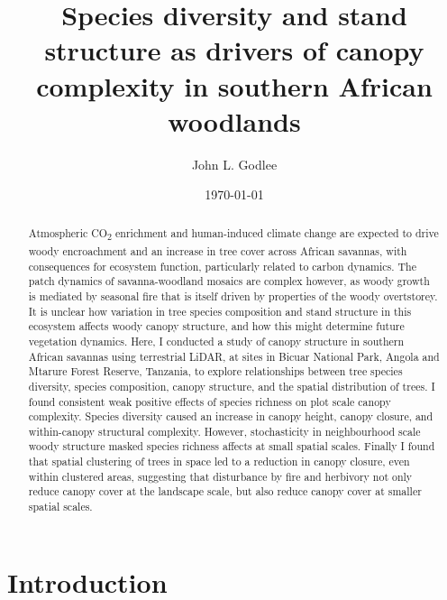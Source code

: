 \documentclass[11pt,a4paper]{article}
\title{Species diversity and stand structure as drivers of canopy complexity in southern African woodlands}
\author{John L. Godlee}
\date{\today}
\begin{document}
\maketitle{}

\linenumbers

\begin{abstract}
Atmospheric CO\textsubscript{2} enrichment and human-induced climate change are expected to drive woody encroachment and an increase in tree cover across African savannas, with consequences for ecosystem function, particularly related to carbon dynamics. The patch dynamics of savanna-woodland mosaics are complex however, as woody growth is mediated by seasonal fire that is itself driven by properties of the woody overtstorey. It is unclear how variation in tree species composition and stand structure in this ecosystem affects woody canopy structure, and how this might determine future vegetation dynamics. Here, I conducted a study of canopy structure in southern African savannas using terrestrial LiDAR, at sites in Bicuar National Park, Angola and Mtarure Forest Reserve, Tanzania, to explore relationships between tree species diversity, species composition, canopy structure, and the spatial distribution of trees. I found consistent weak positive effects of species richness on plot scale canopy complexity. Species diversity caused an increase in canopy height, canopy closure, and within-canopy structural complexity. However, stochasticity in neighbourhood scale woody structure masked species richness affects at small spatial scales. Finally I found that spatial clustering of trees in space led to a reduction in canopy closure, even within clustered areas, suggesting that disturbance by fire and herbivory not only reduce canopy cover at the landscape scale, but also reduce canopy cover at smaller spatial scales.
\end{abstract}

\section{Introduction}
\end{document}
